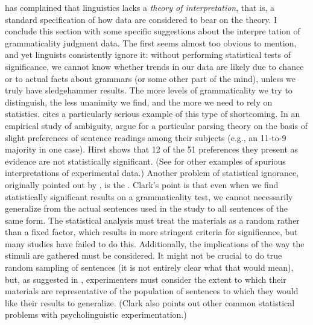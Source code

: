  \citet{Levelt1974} has complained that linguistics lacks a \textit{theory of interpretation}, that is, a standard specification of how data are considered to bear on the theory. I conclude this section with some specific suggestions about the interpre%
 tation of grammaticality judgment data. The first seems almost too obvious to mention, and yet linguists consistently ignore it: without performing statistical tests of significance, we cannot know whether trends in our data are likely due to chance or to actual facts about grammars (or some other part of the mind), unless we truly have sledgehammer results. The more levels of grammaticality we try to distinguish, the less unanimity we find, and the more we need to rely on statistics. \citet[157, fn. 31]{Hirst1987} cites a particularly serious example of this type of shortcoming. In an empirical study of ambiguity,  \citet{FordEtAl1982} argue for a particular parsing theory on the basis of slight preferences of sentence readings among their subjects (e.g., an 11-to-9 majority in one case). Hirst shows that 12 of the 51 preferences they present as evidence are not statistically significant. (See \citet{Birdsong1989} for other examples of spurious interpretations of experimental data.) Another problem of statistical ignorance, originally pointed out by \citet{Clark1973}, is the . Clark's point is that even when we find statistically significant results on a grammaticality test, we cannot necessarily generalize from the actual sentences used in the study to all sentences of the same form. The statistical analysis must treat the materials as a random rather than a fixed factor, which results in more stringent criteria for significance, but many studies have failed to do this. Additionally, the implications of the way the stimuli are gathered must be considered. It might not be crucial to do true random sampling of sentences (it is not entirely clear what that would mean), but, as suggested in , experimenters must consider the extent to which their materials are representative of the population of sentences to which they would like their results to generalize. (Clark also points out other common statistical problems with psycholinguistic experimentation.)

